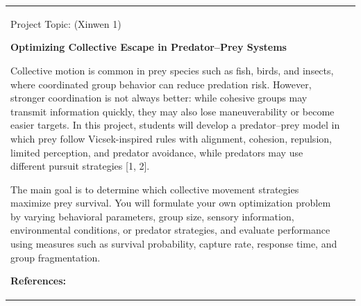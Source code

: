 \documentclass[a4paper,landscape]{article}
\newlength{\HeaderSize}
\newlength{\HeaderSizeBaseline}
\newlength{\SectionSize}
\newlength{\SectionSizeBaseline}
\newlength{\TextSize}
\newlength{\TextSizeBaseline}
\newlength{\vskipHeader}
\newlength{\vskipSection}
\newlength{\vskipText}
\newlength{\LeftPanel}
\newlength{\PanelGap}
\newlength{\RightPanel}
\begin{document}
\noindent
\begin{tabular}{@{}p{\LeftPanel}@{\hspace{\PanelGap}}p{\RightPanel}@{}}

\parbox[t][\LeftPanel][t]{\LeftPanel}{%

\begin{center}
  {\fontsize{\HeaderSize}{\HeaderSizeBaseline}\selectfont\color{topicblue}%
   Project Topic:\hspace{9mm} (Xinwen 1)} 
\end{center}

\vspace{\vskipHeader}

{\fontsize{\SectionSize}{\SectionSizeBaseline}\selectfont\bfseries 
%
Optimizing Collective Escape in Predator–Prey Systems
\par}
\vspace{\vskipSection}

{\fontsize{\TextSize}{\TextSizeBaseline}\selectfont
%
Collective motion is common in prey species such as fish, birds, and insects, where coordinated group behavior can reduce predation risk. However, stronger coordination is not always better: while cohesive groups may transmit information quickly, they may also lose maneuverability or become easier targets. In this project, students will develop a predator–prey model in which prey follow Vicsek-inspired rules with alignment, cohesion, repulsion, limited perception, and predator avoidance, while predators may use different pursuit strategies [1, 2].
\par

\vspace{\vskipText}
The main goal is to determine which collective movement strategies maximize prey survival. You will formulate your own optimization problem by varying behavioral parameters, group size, sensory information, environmental conditions, or predator strategies, and evaluate performance using measures such as survival probability, capture rate, response time, and group fragmentation. 
\par
}

\vfill
\vspace{\vskipSection}
{\fontsize{\SectionSize}{\SectionSizeBaseline}\selectfont\bfseries References:\par}
\vspace{\vskipSection}

}
\end{tabular}
\end{document}
